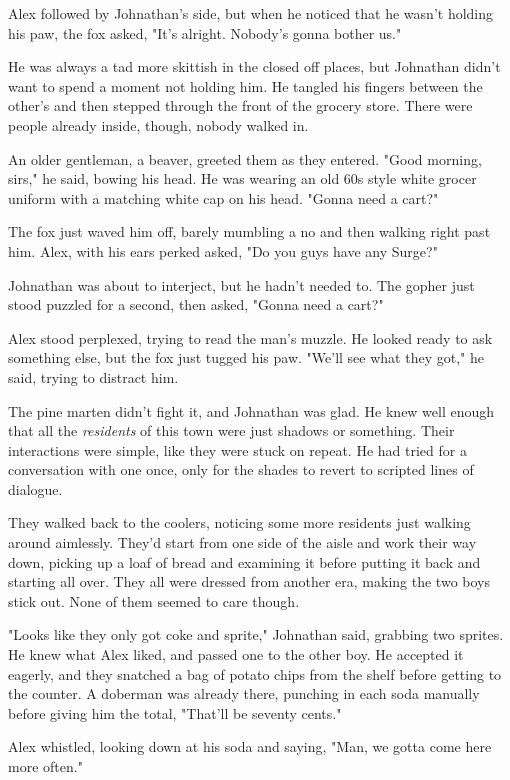 Alex followed by Johnathan's side, but when he noticed that he wasn't holding his paw, the fox asked, "It's alright. Nobody's gonna bother us."

He was always a tad more skittish in the closed off places, but Johnathan didn't want to spend a moment not holding him. He tangled his fingers between the other's and then stepped through the front of the grocery store. There were people already inside, though, nobody walked in.

An older gentleman, a beaver, greeted them as they entered. "Good morning, sirs," he said, bowing his head. He was wearing an old 60s style white grocer uniform with a matching white cap on his head. "Gonna need a cart?"

The fox just waved him off, barely mumbling a no and then walking right past him. Alex, with his ears perked asked, "Do you guys have any Surge?"

Johnathan was about to interject, but he hadn't needed to. The gopher just stood puzzled for a second, then asked, "Gonna need a cart?"

Alex stood perplexed, trying to read the man's muzzle. He looked ready to ask something else, but the fox just tugged his paw. "We'll see what they got," he said, trying to distract him.

The pine marten didn't fight it, and Johnathan was glad. He knew well enough that all the \emph{residents} of this town were just shadows or something. Their interactions were simple, like they were stuck on repeat. He had tried for a conversation with one once, only for the shades to revert to scripted lines of dialogue.

They walked back to the coolers, noticing some more residents just walking around aimlessly. They'd start from one side of the aisle and work their way down, picking up a loaf of bread and examining it before putting it back and starting all over. They all were dressed from another era, making the two boys stick out. None of them seemed to care though.

"Looks like they only got coke and sprite," Johnathan said, grabbing two sprites. He knew what Alex liked, and passed one to the other boy. He accepted it eagerly, and they snatched a bag of potato chips from the shelf before getting to the counter. A doberman was already there, punching in each soda manually before giving him the total, "That'll be seventy cents."

Alex whistled, looking down at his soda and saying, "Man, we gotta come here more often."

